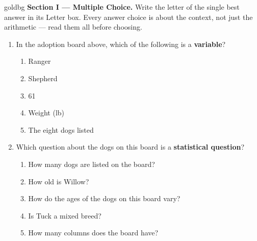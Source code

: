 \vspace{0.14in}

\boxguard[16]
\begin{headlinebox}{goldbg}
\small
\textbf{Section I --- Multiple Choice.} Write the letter of the single best answer in its Letter box. Every answer choice is
about the context, not just the arithmetic --- read them all before choosing.
\end{headlinebox}

\vspace{0.10in}

\begin{enumerate}[leftmargin=1.9em, itemsep=0.14in]

  \item In the adoption board above, which of the following is a \textbf{variable}?
        \begin{enumerate}[label=\textbf{(\Alph*)}, leftmargin=2.2em, itemsep=3pt]
          \item Ranger
          \item Shepherd
          \item 61
          \item Weight (lb) \quad {}
          \item The eight dogs listed
                \hfill{}
        \end{enumerate}

  \item Which question about the dogs on this board is a \textbf{statistical question}?
        \begin{enumerate}[label=\textbf{(\Alph*)}, leftmargin=2.2em, itemsep=3pt]
          \item How many dogs are listed on the board?
          \item How old is Willow?
          \item How do the ages of the dogs on this board vary?
                \quad {}
          \item Is Tuck a mixed breed?
          \item How many columns does the board have?
                \hfill{}
        \end{enumerate}


\end{enumerate}

